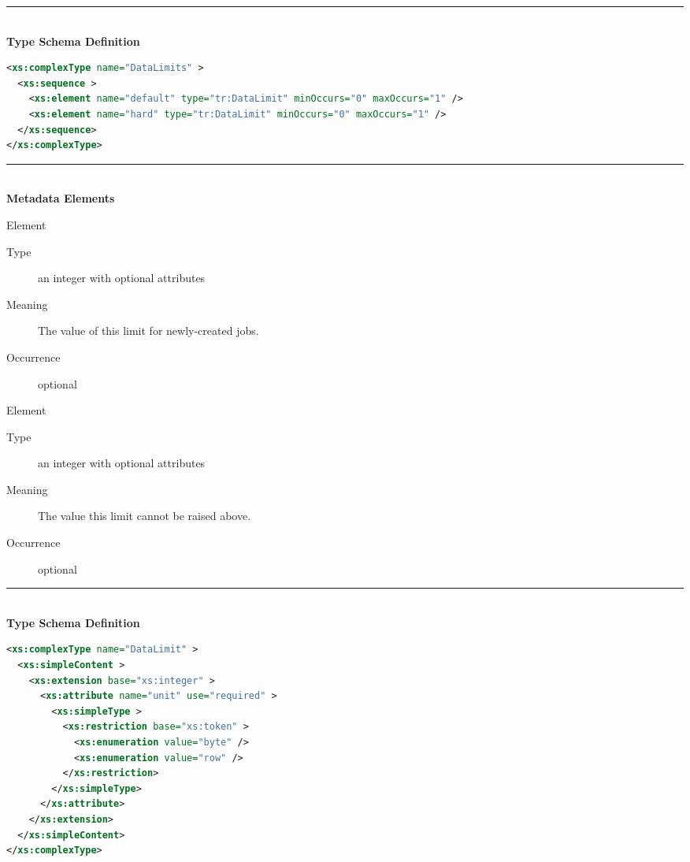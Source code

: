 \documentclass{ivoa}
\begin{document}
\noindent\rule[-2pt]{\textwidth}{0.5pt}\\
			\textbf{ Type Schema Definition}

\begin{lstlisting}[language=XML]
<xs:complexType name="DataLimits" >
  <xs:sequence >
    <xs:element name="default" type="tr:DataLimit" minOccurs="0" maxOccurs="1" />
    <xs:element name="hard" type="tr:DataLimit" minOccurs="0" maxOccurs="1" />
  </xs:sequence>
</xs:complexType>
\end{lstlisting}

\noindent\rule[-2pt]{\textwidth}{0.5pt}\\
					\textbf{ Metadata Elements}

\begin{bigdescription}\item[Element \xmlel{default}]
\begin{description}
\item[Type\quad] an integer with optional attributes
\item[Meaning\quad] 
          The value of this limit for newly-created jobs.
          
\item[Occurrence\quad] optional

\end{description}
\item[Element \xmlel{hard}]
\begin{description}
\item[Type\quad] an integer with optional attributes
\item[Meaning\quad] 
          The value this limit cannot be raised above.
          
\item[Occurrence\quad] optional

\end{description}


\end{bigdescription}



\noindent\rule[-2pt]{\textwidth}{0.5pt}\\
			\textbf{ Type Schema Definition}

\begin{lstlisting}[language=XML]
<xs:complexType name="DataLimit" >
  <xs:simpleContent >
    <xs:extension base="xs:integer" >
      <xs:attribute name="unit" use="required" >
        <xs:simpleType >
          <xs:restriction base="xs:token" >
            <xs:enumeration value="byte" />
            <xs:enumeration value="row" />
          </xs:restriction>
        </xs:simpleType>
      </xs:attribute>
    </xs:extension>
  </xs:simpleContent>
</xs:complexType>
\end{lstlisting}
\end{document}
